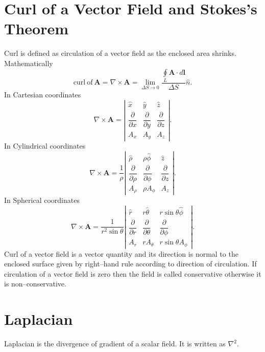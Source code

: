 \documentclass[12pt,a4paper]{article}
\begin{document}
\section{Curl of a Vector Field and Stokes's Theorem}
Curl is defined as circulation of a vector field as the enclosed area shrinks. Mathematically
\begin{equation}
\mathrm{curl~of~\textbf{A}}=\nabla\times\mathrm{\textbf{A}}=\lim_{\Delta S \to 0}\dfrac{\oint\limits_L\mathrm{\textbf{A}}\cdot d\mathrm{\textbf{l}}}{\Delta S}\hat n.
\end{equation}
In Cartesian coordinates
\begin{equation}
\nabla\times \textbf{A}=\left| \begin{array}{ccc} \hat{x} & \hat{y} & \hat{z} \\ \dfrac{\partial}{\partial x} & \dfrac{\partial}{\partial y} & \dfrac{\partial}{\partial z}\\ A_x & A_y & A_z \end{array} \right|.
\end{equation}
In Cylindrical coordinates
\begin{equation}
\nabla\times \textbf{A}=\dfrac{1}{\rho}\left| \begin{array}{ccc} \hat{\rho} & \rho\hat{\phi} & \hat{z} \\ \dfrac{\partial}{\partial\rho} & \dfrac{\partial}{\partial\phi} & \dfrac{\partial}{\partial z}\\ A_\rho & \rho A_\phi & A_z \end{array} \right|.
\end{equation}
In Spherical coordinates
\begin{equation}
\nabla\times \textbf{A}=\dfrac{1}{r^2\sin\theta}\left| \begin{array}{ccc} \hat{r} & r\hat{\theta} & r\sin\theta\hat{\phi} \\ \dfrac{\partial}{\partial r} & \dfrac{\partial}{\partial\theta} & \dfrac{\partial}{\partial\phi}\\ A_r & rA_\theta & r\sin\theta A_\phi \end{array} \right|.
\end{equation}
Curl of a vector field is a vector quantity and its direction is normal to the enclosed surface given by right--hand rule according to direction of circulation. If circulation of a vector field is zero then the field is called conservative otherwise it is non--conservative.
\section{Laplacian}
Laplacian is the divergence of gradient of a scalar field. It is written as $\nabla^2$.
\end{document}
